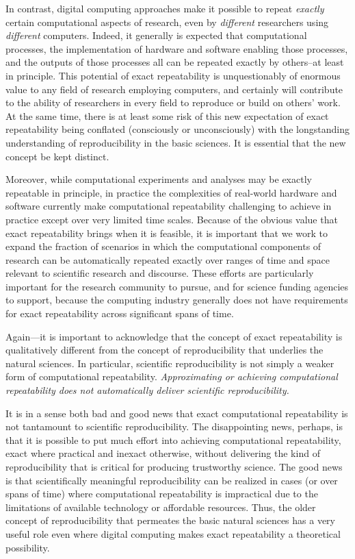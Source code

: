 In contrast, digital computing approaches make it possible to repeat \emph{exactly} certain computational aspects of research,
	 even by \emph{different} researchers using \emph{different} computers.  
Indeed, it generally is expected that computational processes, the implementation of hardware and software 
	enabling those processes, and the outputs of those processes all can be repeated exactly by others--at least in principle.
This potential of exact repeatability is unquestionably of enormous value to any field of research employing computers,
	and certainly will contribute to the ability of researchers in every field to reproduce or build on others' work.
At the same time, there is at least some risk of this new expectation of exact repeatability being conflated 
	(consciously or unconsciously) with the longstanding understanding of reproducibility in the basic sciences. 
It is essential that the new concept be kept distinct.

Moreover, while computational experiments and analyses may be exactly repeatable in principle, 
	in practice the complexities of real-world hardware and software currently make computational repeatability 
	challenging to achieve in practice except over very limited time scales.
Because of the obvious value that exact repeatability brings when it is feasible, it is important that we work to
	expand the fraction of scenarios in which the computational components of research can be automatically 
	repeated exactly over ranges of time and space relevant to scientific research and discourse.
These efforts are particularly important for the research community to pursue, and for science funding
	agencies to support, because the computing industry generally does not have requirements for exact 
	repeatability across significant spans of time.

Again---it is important to acknowledge that the concept of exact repeatability is 
	qualitatively different from the concept of reproducibility that underlies the natural sciences.
In particular, scientific reproducibility is not simply a weaker form of computational repeatability.  
\emph{Approximating or achieving computational repeatability does not automatically deliver scientific reproducibility.}

It is in a sense both bad and good news that exact computational repeatability is not tantamount to scientific reproducibility.
The disappointing news, perhaps, is that it is possible to put much effort into achieving computational repeatability,
	exact where practical and inexact otherwise,
	without delivering the kind of reproducibility that is critical for producing trustworthy science.
The good news is that scientifically meaningful reproducibility can be realized in cases (or over spans of time)
	where computational repeatability is impractical due to the limitations of available technology or affordable resources.
Thus, the older concept of reproducibility that permeates the basic natural sciences has a very
	useful role even where digital computing makes exact repeatability a theoretical possibility.


